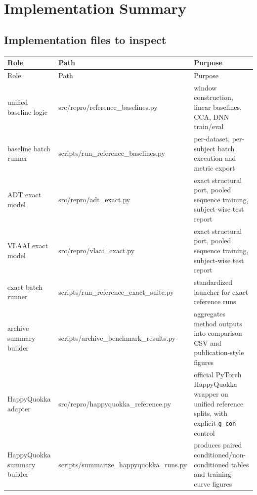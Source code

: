 \documentclass[11pt]{article}
\begin{document}
\section*{Implementation Summary}
\subsection*{Implementation files to inspect}
\begin{longtable}{p{2.2cm} p{4.1cm} p{7.0cm}}
\toprule
Role & Path & Purpose \\
\midrule
\endfirsthead
\toprule
Role & Path & Purpose \\
\midrule
\endhead
unified baseline logic & src/repro/reference\_baselines.py & window construction, linear baselines, CCA, DNN train/eval \\
baseline batch runner & scripts/run\_reference\_baselines.py & per-dataset, per-subject batch execution and metric export \\
ADT exact model & src/repro/adt\_exact.py & exact structural port, pooled sequence training, subject-wise test report \\
VLAAI exact model & src/repro/vlaai\_exact.py & exact structural port, pooled sequence training, subject-wise test report \\
exact batch runner & scripts/run\_reference\_exact\_suite.py & standardized launcher for exact reference runs \\
archive summary builder & scripts/archive\_benchmark\_results.py & aggregates method outputs into comparison CSV and publication-style figures \\
HappyQuokka adapter & src/repro/happyquokka\_reference.py & official PyTorch HappyQuokka wrapper on unified reference splits, with explicit \texttt{g\_con} control \\
HappyQuokka summary builder & scripts/summarize\_happyquokka\_runs.py & produces paired conditioned/non-conditioned tables and training-curve figures \\
\bottomrule
\end{longtable}
\end{document}
